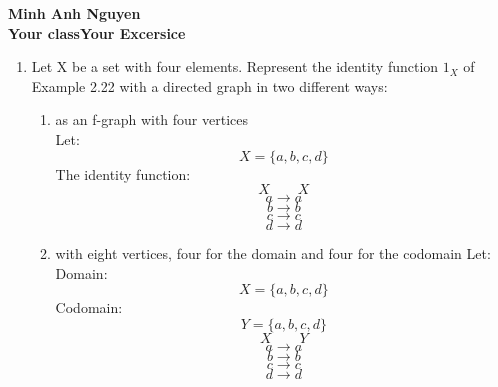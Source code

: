 \documentclass[12pt]{article}
\begin{document}
\textbf{Minh Anh Nguyen }\\
\textbf{Your class\hfill Your Excersice}

\hrulefill

\begin{enumerate}
      \item Let X be a set with four elements. Represent the identity function $1_X$ of Example 2.22 with a directed graph in two different ways:
      \begin{enumerate}
            \item as an f-graph with four vertices\\
            Let:
                  \[X = \{a,b,c,d\}\]
            The identity function:
            \[X \text{~~~~~~} X\]
            \[a \longrightarrow a\]
            \[b \longrightarrow b\]
            \[c \longrightarrow c\]
            \[d \longrightarrow d\]
            \item with eight vertices, four for the domain and four for the codomain
            Let:\\
                  Domain: \[X = \{a,b,c,d\}\]
                  Codomain: \[Y = \{a,b,c,d\}\]
            \[X \text{~~~~~~} Y\]
            \[a \longrightarrow a\]
            \[b \longrightarrow b\]
            \[c \longrightarrow c\]
            \[d \longrightarrow d\]
      \end{enumerate}


\end{enumerate}
\end{document}
